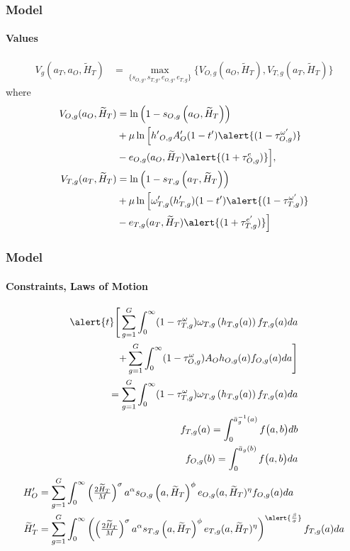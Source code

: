 \documentclass[11pt]{beamer}
\begin{document}
	
	\begin{frame}
		\frametitle{Model}
		\framesubtitle{Values}
		\begin{align*}
			\label{}
			V_g(a_T,a_O,\widetilde{H}_T) & = \max_{\{s_{O,g},s_{T,g},e_{O,g},e_{T,g}\}} \bigg\{ V_{O,g}(a_O,\widetilde{H}_T), V_{T,g}(a_T,\widetilde{H}_T) \bigg\} \label{eq:V}
		\end{align*}
		where
		\begin{align*}
			V_{O,g}(a_O,\widetilde{H}_T) & = \ln\left(1-s_{O,g}\left(a_O,\widetilde{H}_T\right)\right) \nonumber \\
			& + \mu \ln \Big[ {{h'}_{O,g}} A_O'(1-t')\alert{(1-\tau^{\omega '}_{O,g})} \nonumber \\
			& - e_{O,g}(a_O,\widetilde{H}_T)\alert{(1+\tau^e_{O,g})} \Big],\\
			V_{T,g}(a_T,\widetilde{H}_T) & = \ln\left(1-s_{T,g}\left(a_T,\widetilde{H}_T\right)\right) \nonumber \\
			& + \mu \ln \Big[ \omega_{T,g}'({h_{T,g}'})(1-t')\alert{(1-\tau^{\omega '}_{T,g}) }\nonumber \\
			& - e_{T,g}(a_T,\widetilde{H}_T)\alert{(1+\tau^{e '}_{T,g})} \Big] 
		\end{align*}
	\end{frame}
	
	\begin{frame}
		\frametitle{Model}
		\framesubtitle{Constraints, Laws of Motion}
		\footnotesize
		\begin{align*}
			\alert{t}\Bigg[ \sum_{g=1}^G \int_0^\infty (1-\tau^{\omega}_{T,g})\omega_{T,g}\left(h_{T,g}(a)\right) f_{T,g}(a) da  \\
			+ \sum_{g=1}^G \int_0^\infty (1-\tau^{\omega}_{O,g})A_O h_{O,g}(a) f_{O,g}(a) da \Bigg]\\
			= \sum_{g=1}^G \int_0^\infty (1-\tau^{\omega}_{T,g})\omega_{T,g}\left(h_{T,g}(a)\right) f_{T,g}(a) da \\
			f_{T,g}(a)  = \int_0^{\bar{a}_g^{-1}\left(a\right)} f\big(a,b \big) db \\
			f_{O,g}(b)  = \int_0^{\bar{a}_g\left(b\right)} f\big(a,b \big) da 
		\end{align*}
		\begin{align*}
			{H}_{O}' & = \sum_{g=1}^G \int_0^\infty \left(\tfrac{2 \widetilde{H}_T}{M}\right)^\sigma a^\alpha s_{O,g}\left(a,\widetilde{H}_T\right)^\phi e_{O,g}(a,\widetilde{H}_T)^\eta  f_{O,g}(a) da \\
			\widetilde{H}_{T}' & = \sum_{g=1}^G \int_0^\infty \left(\left(\tfrac{2 \widetilde{H}_T}{M}\right)^\sigma a^\alpha s_{T,g}\left(a,\widetilde{H}_T\right)^\phi e_{T,g}(a,\widetilde{H}_T)^\eta \right)^{\alert{\frac{\beta}{\sigma}}} f_{T,g}(a) da 
		\end{align*}
	\end{frame}
	
\end{document}

